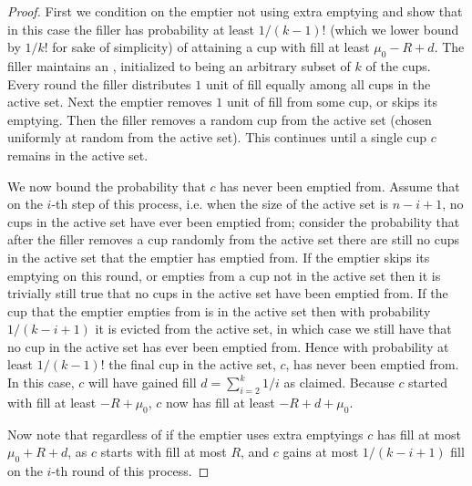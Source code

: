 \begin{proof}
  First we condition on the emptier not using extra emptying
  and show that in this case the filler has probability at least
  $1/(k-1)!$ (which we lower bound by $1/k!$ for sake of
  simplicity) of attaining a cup with fill at least $\mu_0 -R +d$.
  The filler maintains an , initialized to being
  an arbitrary subset of $k$ of the cups. Every round the filler
  distributes $1$ unit of fill equally among all cups in the
  active set. Next the emptier removes $1$ unit of fill from some
  cup, or skips its emptying. Then the filler removes a random
  cup from the active set (chosen uniformly at random from the
  active set). This continues until a single cup $c$ remains in
  the active set. 

  We now bound the probability that $c$ has never been emptied
  from. Assume that on the $i$-th step of this process, i.e. when
  the size of the active set is $n-i+1$, no cups in the active
  set have ever been emptied from; consider the probability that
  after the filler removes a cup randomly from the active set
  there are still no cups in the active set that the emptier has
  emptied from. If the emptier skips its emptying on this round,
  or empties from a cup not in the active set then it is
  trivially still true that no cups in the active set have been
  emptied from. If the cup that the emptier empties from is in
  the active set then with probability $1/(k-i+1)$ it is evicted
  from the active set, in which case we still have that no
  cup in the active set has ever been emptied from. Hence with
  probability at least $1/(k-1)!$ the final cup in the
  active set, $c$, has never been emptied from. In this case, $c$
  will have gained fill $d=\sum_{i=2}^k 1/i$ as claimed. Because
  $c$ started with fill at least $-R+\mu_0$, $c$ now has fill at
  least $-R+ d+\mu_0$. 

  Now note that regardless of if the emptier uses extra emptyings
  $c$ has fill at most $\mu_0 + R + d$, as $c$ starts with fill
  at most $R$, and $c$ gains at most $1/(k-i+1)$ fill on the
  $i$-th round of this process. 


\end{proof}
